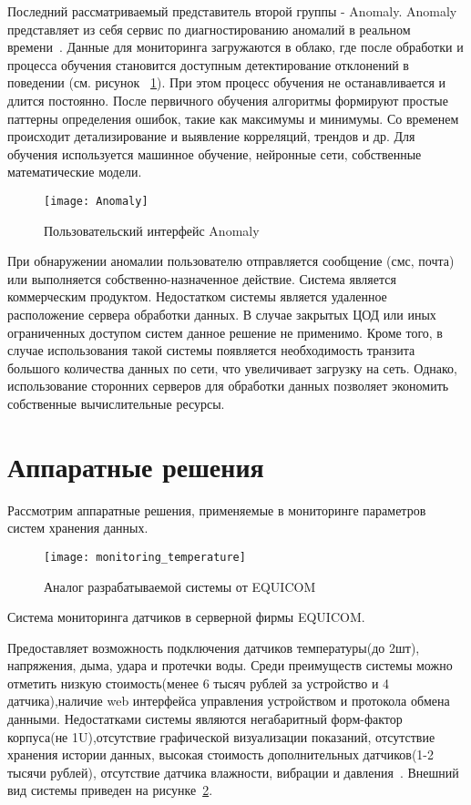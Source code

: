 Последний рассматриваемый представитель второй группы - Anomaly. Anomaly представляет из себя сервис по диагностированию аномалий в реальном времени~\cite{Anomaly}. Данные для мониторинга загружаются в облако, где после обработки и процесса обучения становится доступным детектирование отклонений в поведении (см. рисунок ~\ref{fig:Anomaly}). При этом процесс обучения не останавливается и длится постоянно. После первичного обучения алгоритмы формируют простые паттерны определения ошибок, такие как максимумы и минимумы. Со временем происходит детализирование и выявление корреляций, трендов и др. Для обучения используется машинное обучение, нейронные сети, собственные математические модели. 
\begin{figure}[!h]
	\centering
	\texttt{[image: Anomaly]}
	\caption{Пользовательский интерфейс Anomaly}
	\label{fig:Anomaly}
\end{figure}

При обнаружении аномалии пользователю отправляется сообщение (смс, почта) или выполняется собственно-назначенное действие. Система является коммерческим продуктом. Недостатком системы является удаленное расположение сервера обработки данных. В случае закрытых ЦОД или иных ограниченных доступом систем данное решение не применимо. Кроме того, в случае использования такой системы появляется необходимость транзита большого количества данных по сети, что увеличивает загрузку на сеть. Однако, использование сторонних серверов для обработки данных позволяет экономить собственные вычислительные ресурсы. 

\section{Аппаратные решения}
Рассмотрим аппаратные решения, применяемые в мониторинге параметров систем хранения данных. 

\begin{figure}[!h]
	\centering
	\texttt{[image: monitoring\_temperature]}
	\caption{Аналог разрабатываемой системы от EQUICOM}
	\label{fig:monitoring_temperature}
\end{figure}

Система мониторинга датчиков в серверной фирмы EQUICOM.

Предоставляет возможность подключения датчиков температуры(до 2шт), напряжения, дыма, удара и протечки воды. Среди преимуществ системы можно отметить низкую стоимость(менее 6 тысяч рублей за устройство и 4 датчика),наличие web интерфейса управления устройством и протокола обмена данными. Недостатками системы являются негабаритный форм-фактор корпуса(не 1U),отсутствие графической визуализации показаний, отсутствие хранения истории  данных, высокая стоимость дополнительных датчиков(1-2 тысячи рублей), отсутствие датчика влажности, вибрации и давления~\cite{analog1}. Внешний вид системы приведен на рисунке~\ref{fig:monitoring_temperature}.

